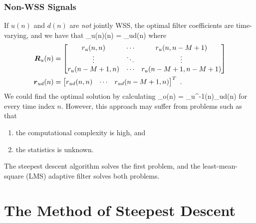 \subsubsection{Non-WSS Signals}
If $u(n)$ and $d(n)$ are \textit{not} jointly WSS, the optimal filter coefficients are time-varying, and we have that
\bmath
  _u(n)(n) = _{ud}(n)
\emath
where
\begin{align}
  \boldsymbol{R}_u(n) &=
  \begin{bmatrix}
    r_u(n,n) & \cdots & r_u(n,n-M+1)\\
    \vdots & \ddots & \vdots\\
    r_u(n-M+1,n) & \cdots & r_u(n-M+1,n-M+1)\\
  \end{bmatrix}\\
  \boldsymbol{r}_{ud}(n) &= \begin{bmatrix} r_{ud}(n,n) & \cdots & r_{ud}(n-M+1,n)\end{bmatrix}^T\ .
\end{align}
We could find the optimal solution by calculating
\bmath
  _o(n) = _u^{-1}(n)_{ud}(n)
\emath
for every time index $n$. However, this approach may suffer from problems such as that
\begin{enumerate}
  \item the computational complexity is high, and
  \item the statistics is unknown.
\end{enumerate}
The steepest descent algorithm solves the first problem, and the least-mean-square (LMS) adaptive filter solves both problems.

\section{The Method of Steepest Descent}
